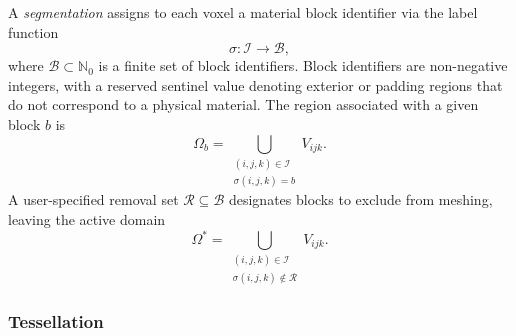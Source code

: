 \documentclass[review,12pt]{elsarticle}
\begin{document}
A \emph{segmentation} assigns to each voxel a material block identifier
via the label function
\begin{equation}
  \sigma : \mathcal{I} \to \mathcal{B},
\end{equation}
where $\mathcal{B} \subset \mathbb{N}_0$ is a finite set of block identifiers.
Block identifiers are non-negative integers, with a reserved sentinel value
denoting exterior or padding regions that do not correspond to a physical material.
The region associated with a given block $b$ is
\begin{equation}
  \Omega_b = \bigcup_{\substack{(i,j,k)\in\mathcal{I}\\\sigma(i,j,k)=b}} V_{ijk}.
\end{equation}
A user-specified removal set $\mathcal{R} \subseteq \mathcal{B}$
designates blocks to exclude from meshing, leaving the active domain
\begin{equation}
  \Omega^* = \bigcup_{\substack{(i,j,k)\in\mathcal{I}\\\sigma(i,j,k)\notin\mathcal{R}}} V_{ijk}.
\end{equation}

\subsubsection{Tessellation}
\end{document}
